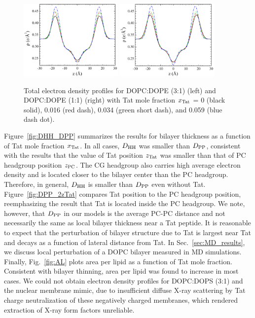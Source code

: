 \begin{figure}[htbp]
  \centering
  \includegraphics[width=0.45\textwidth]{figures/Tat/SDP_Results/EDP/DOPCDOPE3to1_Tat_total_EDP}
  \qquad
  \includegraphics[width=0.45\textwidth]{figures/Tat/SDP_Results/EDP/DOPCDOPE1to1_Tat_total_EDP}
  \caption[Total electron density profiles for DOPC:DOPE (3:1) (left) and 
  DOPC:DOPE (1:1) (right) with Tat mole fraction $\xTat$ = 0 (black solid),
  0.016 (red dash), 0.034 (green short dash), and 0.059 (blue dash dot)]
  {Total electron density profiles for DOPC:DOPE (3:1) (left) and 
  DOPC:DOPE (1:1) (right) with Tat mole fraction $\xTat$ = 0 (black solid),
  0.016 (red dash), 0.034 (green short dash), and 0.059 (blue dash dot).}
  \label{fig:DOPCDOPE_Tat_total_EDP}
\end{figure}

Figure~\ref{fig:DHH_DPP} summarizes the results for bilayer thickness as a function
of Tat mole fraction $\xTat$. In all cases, $D_\textrm{HH}$ was smaller than $D_\textrm{PP}$, consistent
with the results that the value of Tat position $z_\textrm{Tat}$ was smaller 
than that of PC headgroup position $z_\textrm{PC}$. The CG headgroup also carries 
high average electron density and is located closer to the bilayer center than
the PC headgroup. Therefore, in general, $D_\textrm{HH}$ is smaller than $D_\textrm{PP}$ even
without Tat. Figure~\ref{fig:DPP_2zTat} compares Tat position 
to the PC headgroup position, reemphasizing the result that Tat is located
inside the PC headgroup. We note, however, that $D_\textrm{PP}$ in our models is
the average PC-PC distance and not necessarily the same as local bilayer 
thickness near a Tat peptide. It is reasonable to expect that the perturbation
of bilayer structure due to Tat is largest near Tat and decays as a
function of lateral distance from Tat. In Sec.~\ref{sec:MD_results}, we 
discuss local perturbation of a DOPC bilayer measured in MD simulations.
Finally, Fig.~\ref{fig:AL} plots area per lipid as a function of Tat mole
fraction. Consistent with bilayer thinning, area per lipid was found to 
increase in most cases. 
We could not obtain electron density profiles for DOPC:DOPS (3:1) and the nuclear membrane 
mimic, due to insufficient diffuse X-ray scattering by Tat charge neutralization 
of these negatively charged membranes, which rendered extraction of 
X-ray form factors unreliable.

